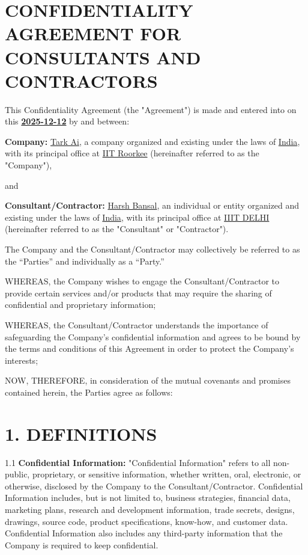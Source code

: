 \documentclass[12pt]{article}
\begin{document}
\section*{CONFIDENTIALITY AGREEMENT FOR CONSULTANTS AND CONTRACTORS}

This Confidentiality Agreement (the "Agreement") is made and entered into on this \textbf{\underline{2025-12-12}} by and between:

\textbf{Company:} \underline{Tark Ai}, a company organized and existing under the laws of \underline{India}, with its principal office at \underline{IIT Roorkee} (hereinafter referred to as the "Company"),

and

\textbf{Consultant/Contractor:} \underline{Harsh Bansal}, an individual or entity organized and existing under the laws of \underline{India}, with its principal office at \underline{IIIT DELHI} (hereinafter referred to as the "Consultant" or "Contractor").

The Company and the Consultant/Contractor may collectively be referred to as the “Parties” and individually as a “Party.”

WHEREAS, the Company wishes to engage the Consultant/Contractor to provide certain services and/or products that may require the sharing of confidential and proprietary information;

WHEREAS, the Consultant/Contractor understands the importance of safeguarding the Company’s confidential information and agrees to be bound by the terms and conditions of this Agreement in order to protect the Company’s interests;

NOW, THEREFORE, in consideration of the mutual covenants and promises contained herein, the Parties agree as follows:

\section*{1. DEFINITIONS}

1.1 \textbf{Confidential Information:} "Confidential Information" refers to all non-public, proprietary, or sensitive information, whether written, oral, electronic, or otherwise, disclosed by the Company to the Consultant/Contractor. Confidential Information includes, but is not limited to, business strategies, financial data, marketing plans, research and development information, trade secrets, designs, drawings, source code, product specifications, know-how, and customer data. Confidential Information also includes any third-party information that the Company is required to keep confidential.
\end{document}

